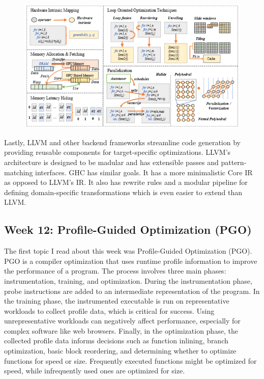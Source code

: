 \documentclass[11pt, a4paper, titlepage]{article}
\begin{document}
\begin{figure}[H]
  \centering
  \includegraphics[scale=0.4]{images/r16.png}
\end{figure}

Lastly, LLVM and other backend frameworks streamline code generation by providing reusable components for target-specific optimizations.
LLVM's architecture is designed to be madular and has extensible passes and pattern-matching interfaces.
GHC has similar goals.
It has a more minimalistic Core IR as opposed to LLVM's IR.
It also has rewrite rules and a modular pipeline for defining domain-specific transformations which is even easier to extend than LLVM.

\subsection{Week 12: Profile-Guided Optimization (PGO)}

The first topic I read about this week was Profile-Guided Optimization (PGO). PGO is a compiler optimization that uses runtime profile information to improve the performance of a program. The process involves three main phases: instrumentation, training, and optimization. During the instrumentation phase, probe instructions are added to an intermediate representation of the program. In the training phase, the instrumented executable is run on representative workloads to collect profile data, which is critical for success. Using unrepresentative workloads can negatively affect performance, especially for complex software like web browsers. Finally, in the optimization phase, the collected profile data informs decisions such as function inlining, branch optimization, basic block reordering, and determining whether to optimize functions for speed or size. Frequently executed functions might be optimized for speed, while infrequently used ones are optimized for size.
\end{document}
